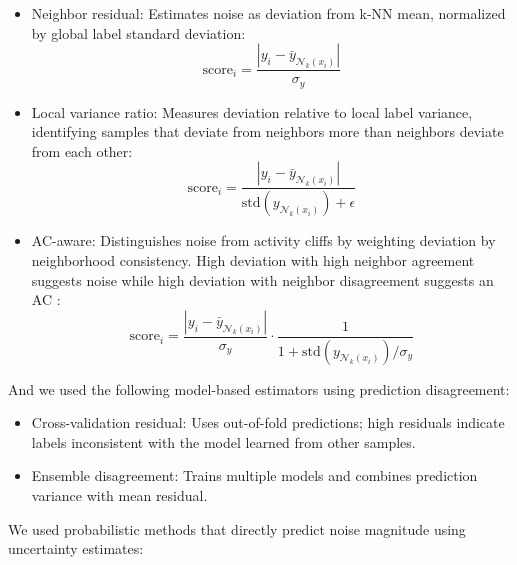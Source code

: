\begin{itemize}
    \item Neighbor residual: Estimates noise as deviation from k-NN mean, normalized by global label standard deviation:
    $$\text{score}_i = \frac{|y_i - \bar{y}_{\mathcal{N}_k(x_i)}|}{\sigma_y}$$
    
    \item Local variance ratio: Measures deviation relative to local label variance, identifying samples that deviate from neighbors more than neighbors deviate from each other:
    $$\text{score}_i = \frac{|y_i - \bar{y}_{\mathcal{N}_k(x_i)}|}{\text{std}(y_{\mathcal{N}_k(x_i)}) + \epsilon}$$
    
    \item AC-aware: Distinguishes noise from activity cliffs by weighting deviation by neighborhood consistency. High deviation with high neighbor agreement suggests noise while high deviation with neighbor disagreement suggests an AC \citep{Dablander2023}:
    $$\text{score}_i = \frac{|y_i - \bar{y}_{\mathcal{N}_k(x_i)}|}{\sigma_y} \cdot \frac{1}{1 + \text{std}(y_{\mathcal{N}_k(x_i)})/\sigma_y}$$
\end{itemize}

And we used the following model-based estimators using prediction disagreement:

\begin{itemize}
    \item Cross-validation residual: Uses out-of-fold predictions; high residuals indicate labels inconsistent with the model learned from other samples.
    \item Ensemble disagreement: Trains multiple models and combines prediction variance with mean residual.
\end{itemize}

We used probabilistic methods that directly predict noise magnitude using uncertainty estimates:

